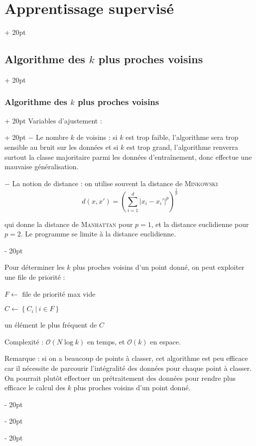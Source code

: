 \documentclass[a4paper, 12pt, twoside]{article}
\newenvironment{indalgo}[2][H]{
    \begin{algoBox}
        \begin{algorithm}[#1]
            \caption{#2}
}
{
        \end{algorithm}
    \end{algoBox}
}
\newcommand{\nset}[2]{\left\llbracket #1\ ;\ #2 \right\rrbracket}
\newcommand{\lr}[1]{\left( #1 \right)}
\newcommand{\set}[1]{\left\{ #1 \right\}}
\newcommand{\abs}[1]{\left\lvert #1 \right\rvert}
\newcommand{\ind}[1][20pt]{\advance\leftskip + #1}
\newcommand{\deind}[1][20pt]{\advance\leftskip - #1}
\newenvironment{indt}[2][20pt]{#2 \par \ind[#1]}{\par \deind} %
\begin{document}
\begin{indt}{\section{Apprentissage supervisé}}
\begin{indt}{\subsection{Algorithme des $k$ plus proches voisins}}
\begin{indt}{\subsubsection{Algorithme des $k$ plus proches voisins}}
\begin{indt}{Variables d'ajustement :}
                    $-$ Le nombre $k$ de voisins : si $k$ est trop faible, l'algorithme sera trop sensible au bruit sur les données et si $k$ est trop grand, l'algorithme renverra surtout la classe majoritaire parmi les données d'entraînement, donc effectue une mauvaise généralisation.

                    $-$ La notion de distance : on utilise souvent la distance de \textsc{Minkowski}
                    \[
                        d(x, x') = \lr{\sum_{i = 1}^d \abs{x_i - x_i'}^p}^{\tfrac 1 p}
                    \]

                    qui donne la distance de \textsc{Manhattan} pour $p = 1$, et la distance euclidienne pour $p = 2$.
                    Le programme se limite à la distance euclidienne.
                \end{indt}

                Pour déterminer les $k$ plus proches voisins d'un point donné, on peut exploiter une file de priorité :

                \begin{indalgo}{$k$ plus proches voisins}
                    \KwInput{données d'entraînement $\lr{x_i, y_i}_{i \in \nset 1 N}$}

                    \BlankLine

                    $F \gets$ file de priorité max vide\;



                    $C \gets \set{C_i\ |\ i \in F}$\;

                    \Return un élément le plus fréquent de $C$\;
                \end{indalgo}

                Complexité : $\mathcal O(N\log k)$ en temps, et $\mathcal O(k)$ en espace.

                \vspace{12pt}
                
                Remarque : si on a beaucoup de points à classer, cet algorithme est peu efficace car il nécessite de parcourir l'intégralité des données pour chaque point à classer. On pourrait plutôt effectuer un prétraitement des données pour rendre plus efficace le calcul des $k$ plus proches voisins d'un point donné.
            \end{indt}


\end{indt}
\end{indt}
\end{document}
